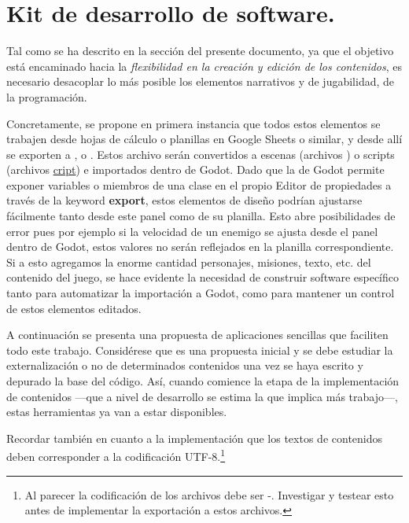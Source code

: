 
\section{Kit de desarrollo de software.}\label{kit:kit-de-desarrollo}

Tal como se ha descrito en la sección  del presente documento, ya que el objetivo está encaminado hacia la \emph{flexibilidad en la creación y edición de los contenidos}, es necesario desacoplar lo más posible los elementos narrativos y de jugabilidad, de la programación.

Concretamente, se propone en primera instancia que todos estos elementos se trabajen desde hojas de cálculo o planillas en Google Sheets o similar, y desde allí se exporten a ,  o . Estos archivo serán convertidos a escenas (archivos \href{https://docs.godotengine.org/es/stable/development/file_formats/tscn.html}{}) o scripts (archivos \href{https://docs.godotengine.org/es/stable/development/file_formats/gdscript_grammar.html}{cript}) e importados dentro de Godot. Dado que la  de Godot permite exponer variables o miembros de una clase en el propio Editor de propiedades a través de la keyword \textbf{export}, estos elementos de diseño podrían ajustarse fácilmente tanto desde este panel como de su planilla. Esto abre posibilidades de error pues por ejemplo si la velocidad de un enemigo se ajusta desde el panel dentro de Godot, estos valores no serán reflejados en la planilla correspondiente. Si a esto agregamos la enorme cantidad personajes, misiones, texto, etc. del contenido del juego, se hace evidente la necesidad de construir software específico tanto para automatizar la importación a Godot, como para mantener un control de estos elementos editados.

A continuación se presenta una propuesta de aplicaciones sencillas que faciliten todo este trabajo. Considérese que es una propuesta inicial y se debe estudiar la externalización o no de determinados contenidos una vez se haya escrito y depurado la base del código. Así, cuando comience la etapa de la implementación de contenidos ---que a nivel de desarrollo se estima la que implica más trabajo---, estas herramientas ya van a estar disponibles.

Recordar también en cuanto a la implementación que los textos de contenidos deben corresponder a la codificación UTF-8.\footnote{Al parecer la codificación de los archivos  debe ser -. Investigar y testear esto antes de implementar la exportación a estos archivos.}

